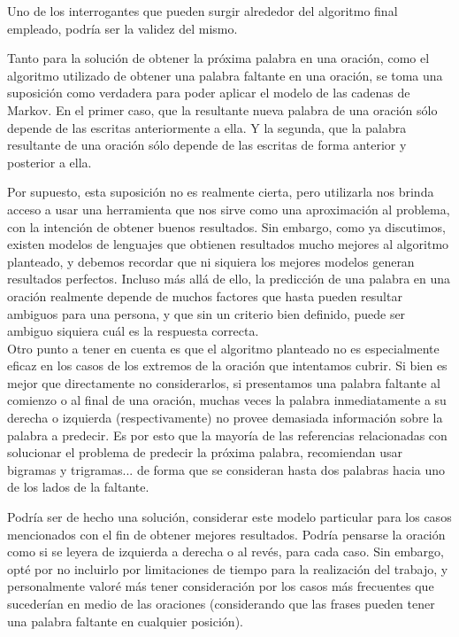 \documentclass[a4paper]{article}
\begin{document}
Uno de los interrogantes que pueden surgir alrededor del algoritmo final empleado, podría ser la validez del mismo. 

Tanto para la solución de obtener la próxima palabra en una oración, como el algoritmo utilizado de obtener una palabra faltante en una oración, se toma una suposición como verdadera para poder aplicar el modelo de las cadenas de Markov. En el primer caso, que la resultante nueva palabra de una oración sólo depende de las escritas anteriormente a ella. Y la segunda, que la palabra resultante de una oración sólo depende de las escritas de forma anterior y posterior a ella. 

Por supuesto, esta suposición no es realmente cierta, pero utilizarla nos brinda acceso a usar una herramienta que nos sirve como una aproximación al problema, con la intención de obtener buenos resultados. Sin embargo, como ya discutimos, existen modelos de lenguajes que obtienen resultados mucho mejores al algoritmo planteado, y debemos recordar que ni siquiera los mejores modelos generan resultados perfectos. Incluso más allá de ello, la predicción de una palabra en una oración realmente depende de muchos factores que hasta pueden resultar ambiguos para una persona, y que sin un criterio bien definido, puede ser ambiguo siquiera cuál es la respuesta correcta. \\

Otro punto a tener en cuenta es que el algoritmo planteado no es especialmente eficaz en los casos de los extremos de la oración que intentamos cubrir. Si bien es mejor que directamente no considerarlos, si presentamos una palabra faltante al comienzo o al final de una oración, muchas veces la palabra inmediatamente a su derecha o izquierda (respectivamente) no provee demasiada información sobre la palabra a predecir. Es por esto que la mayoría de las referencias relacionadas con solucionar el problema de predecir la próxima palabra, recomiendan usar bigramas y trigramas... de forma que se consideran hasta dos palabras hacia uno de los lados de la faltante.\cite{TdsGen}\cite{CambridgeLecture}\cite{WikiNgram}

Podría ser de hecho una solución, considerar este modelo particular para los casos mencionados con el fin de obtener mejores resultados. Podría pensarse la oración como si se leyera de izquierda a derecha o al revés, para cada caso. Sin embargo, opté por no incluirlo por limitaciones de tiempo para la realización del trabajo, y personalmente valoré más tener consideración por los casos más frecuentes que sucederían en medio de las oraciones (considerando que las frases pueden tener una palabra faltante en cualquier posición).\\
\end{document}
